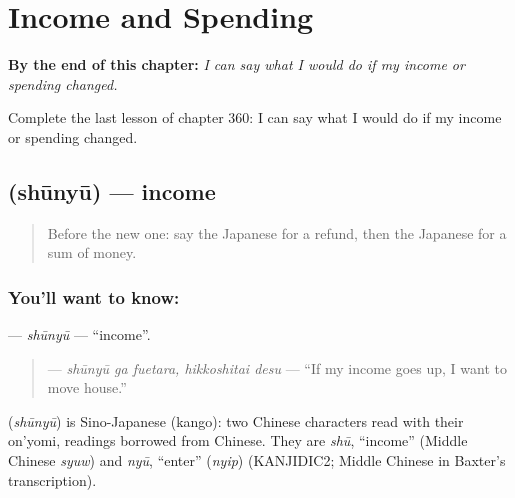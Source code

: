 
\chapter{Income and Spending}
\label{ch:ja-income-and-spending}

\begin{chapteropening}
\textbf{By the end of this chapter:} \emph{I can say what I would do if my income or spending changed.}

Complete the last lesson of chapter 360: I can say what I would do if my income or spending changed.
\end{chapteropening}

\section[\texorpdfstring{\ja{しゅうにゅう} (shūnyū)}{しゅうにゅう (shūnyū)}]{ (shūnyū) — income}

\label{lesson:JA-C360-shuunyuu}



\begin{quote}
Before the new one: say the Japanese for a refund, then the Japanese for a sum of money.
\end{quote}

\subsection*{You'll want to know: }
\textbf{} — \emph{shūnyū} — \textquotedblleft{}income\textquotedblright{}.

\begin{quote}
\textbf{ } — \emph{shūnyū ga fuetara, hikkoshitai desu} — \textquotedblleft{}If my income goes up, I want to move house.\textquotedblright{}
\end{quote}

\begin{cousinweb}
\textbf{} (\emph{shūnyū}) is Sino-Japanese (kango): two Chinese characters read with their on'yomi, readings borrowed from Chinese. They are \emph{shū}, \textquotedblleft{}income\textquotedblright{} (Middle Chinese \emph{syuw}) and \emph{nyū}, \textquotedblleft{}enter\textquotedblright{} (\emph{nyip}) (KANJIDIC2; Middle Chinese in Baxter's transcription).
\end{cousinweb}

